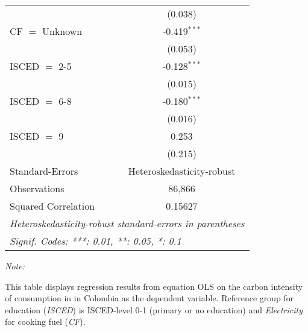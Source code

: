 \begin{table}[htbp!]
\begin{adjustbox}{width = 1\textwidth, max height = 0.95\textheight, center}
\begin{threeparttable}[b]
\begin{tabular}{lc}
                                & (0.038)\\   
            CF $=$ Unknown      & -0.419$^{***}$\\   
                                & (0.053)\\   
            ISCED $=$ 2-5       & -0.128$^{***}$\\   
                                & (0.015)\\   
            ISCED $=$ 6-8       & -0.180$^{***}$\\   
                                & (0.016)\\   
            ISCED $=$ 9         & 0.253\\   
                                & (0.215)\\   
            \midrule 
            Standard-Errors     & Heteroskedasticity-robust \\   
            Observations        & 86,866\\  
            Squared Correlation & 0.15627\\  
            \midrule \midrule
            \multicolumn{2}{l}{\emph{Heteroskedasticity-robust standard-errors in parentheses}}\\
            \multicolumn{2}{l}{\emph{Signif. Codes: ***: 0.01, **: 0.05, *: 0.1}}\\
         \end{tabular}
         
         \begin{tablenotes}\item \medskip \textit{Note:}
            \item This table displays regression results from equation OLS on the carbon intensity of consumption in  in Colombia as the dependent variable. Reference group for education (\textit{ISCED}) is ISCED-level 0-1 (primary or no education) and \textit{Electricity} for cooking fuel (\textit{CF}).
         \end{tablenotes}
      \end{threeparttable}
   \end{adjustbox}
\end{table}


